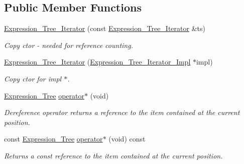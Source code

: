 \subsection*{Public Member Functions}
\begin{DoxyCompactItemize}
\item 
\hyperlink{classMadara_1_1Expression__Tree_1_1Expression__Tree__Iterator_a457370ee0fa2bdcd1f152c5999a3d085}{Expression\_\-Tree\_\-Iterator} (const \hyperlink{classMadara_1_1Expression__Tree_1_1Expression__Tree__Iterator}{Expression\_\-Tree\_\-Iterator} \&ts)
\begin{DoxyCompactList}\small\item\em Copy ctor -\/ needed for reference counting. \item\end{DoxyCompactList}\item 
\hyperlink{classMadara_1_1Expression__Tree_1_1Expression__Tree__Iterator_a5f4cc49d6b2d2bbe9ca8e9bd949f70d1}{Expression\_\-Tree\_\-Iterator} (\hyperlink{classMadara_1_1Expression__Tree_1_1Expression__Tree__Iterator__Impl}{Expression\_\-Tree\_\-Iterator\_\-Impl} $\ast$impl)
\begin{DoxyCompactList}\small\item\em Copy ctor for impl $\ast$. \item\end{DoxyCompactList}\item 
\hyperlink{classMadara_1_1Expression__Tree_1_1Expression__Tree}{Expression\_\-Tree} \hyperlink{classMadara_1_1Expression__Tree_1_1Expression__Tree__Iterator_ac2f536d62b2d523c568c147a648e010a}{operator$\ast$} (void)
\begin{DoxyCompactList}\small\item\em Dereference operator returns a reference to the item contained at the current position. \item\end{DoxyCompactList}\item 
const \hyperlink{classMadara_1_1Expression__Tree_1_1Expression__Tree}{Expression\_\-Tree} \hyperlink{classMadara_1_1Expression__Tree_1_1Expression__Tree__Iterator_ab2fa75c7a238dd7b922044fef2c16f6e}{operator$\ast$} (void) const 
\begin{DoxyCompactList}\small\item\em Returns a const reference to the item contained at the current position. \item\end{DoxyCompactList}\item 

\end{DoxyCompactItemize}
